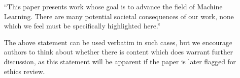 \documentclass{article}
\theoremstyle{plain}
\theoremstyle{definition}
\theoremstyle{remark}
\begin{document}
``This paper presents work whose goal is to advance the field of Machine
Learning. There are many potential societal consequences of our work, none
which we feel must be specifically highlighted here.''

The above statement can be used verbatim in such cases, but we encourage
authors to think about whether there is content which does warrant further
discussion, as this statement will be apparent if the paper is later flagged
for ethics review.

\nocite{langley00}




\newpage
\appendix
\onecolumn



\end{document}
